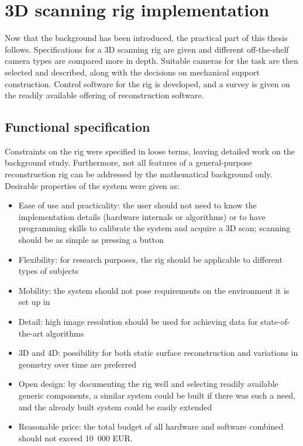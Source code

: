 \section{3D scanning rig implementation} \label{sec:implementation}

Now that the background has been introduced, the practical part of this thesis follows.
Specifications for a 3D scanning rig are given and different off-the-shelf camera types are compared more in depth.
Suitable cameras for the task are then selected and described, along with the decisions on mechanical support construction.
Control software for the rig is developed, and a survey is given on the readily available offering of reconstruction software.

\subsection{Functional specification} %

Constraints on the rig were specified in loose terms, leaving detailed work on the background study.
Furthermore, not all features of a general-purpose reconstruction rig can be addressed by the mathematical background only.
Desirable properties of the system were given as:

\begin{itemize}
	\item Ease of use and practicality: the user should not need to know the implementation details (hardware internals or algorithms) or to have programming skills to calibrate the system and acquire a 3D scan; scanning should be as simple as pressing a button
	\item Flexibility: for research purposes, the rig should be applicable to different types of subjects
	\item Mobility: the system should not pose requirements on the environment it is set up in
	\item Detail: high image resolution should be used for achieving data for state-of-the-art algorithms
	\item 3D and 4D: possibility for both static surface reconstruction and variations in geometry over time are preferred
	\item Open design: by documenting the rig well and selecting readily available generic components, a similar system could be built if there was such a need, and the already built system could be easily extended
	\item Reasonable price: the total budget of all hardware and software combined should not exceed 10~000 EUR.
\end{itemize}


